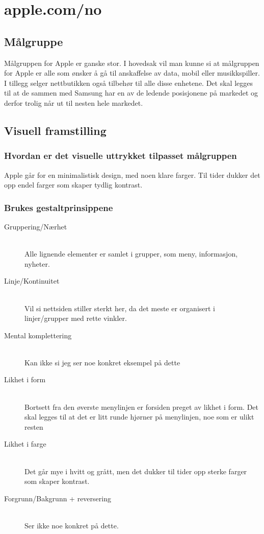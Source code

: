 \section{apple.com/no}

\subsection{Målgruppe}

Målgruppen for Apple er ganske stor. I hovedsak vil man kunne si at målgruppen for Apple er alle som ønsker å gå til anskaffelse av data, mobil eller musikkspiller. I tillegg selger nettbutikken også tilbehør til alle disse enhetene. Det skal legges til at de sammen med Samsung har en av de ledende posisjonene på markedet og derfor trolig når ut til nesten hele markedet. 

\subsection{Visuell framstilling}

\subsubsection{Hvordan er det visuelle uttrykket tilpasset målgruppen}

Apple går for en minimalistisk design, med noen klare farger. Til tider dukker det opp endel farger som skaper tydlig kontrast. 

\subsubsection{Brukes gestaltprinsippene}

\begin{description}
  \item[Gruppering/Nærhet] \hfill \\
  Alle lignende elementer er samlet i grupper, som meny, informasjon, nyheter.
  \item[Linje/Kontinuitet] \hfill \\
  Vil si nettsiden stiller sterkt her, da det meste er organisert i linjer/grupper med rette vinkler.
  \item[Mental komplettering] \hfill \\
    Kan ikke si jeg ser noe konkret eksempel på dette
   \item[Likhet i form] \hfill \\
  Bortsett fra den øverste menylinjen er forsiden preget av likhet i form. Det skal legges til at det er  litt runde hjørner på menylinjen, noe som er ulikt resten
  \item[Likhet i farge] \hfill \\
  Det går mye i hvitt og grått, men det dukker til tider opp sterke farger som skaper kontrast.
  \item[Forgrunn/Bakgrunn + reversering] \hfill \\
    Ser ikke noe konkret på dette. 
\end{description}

